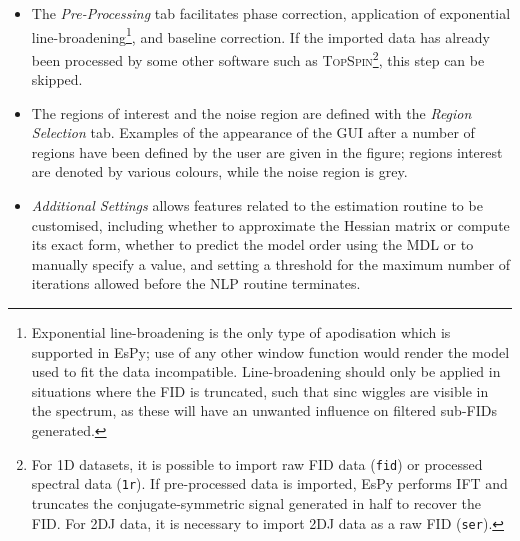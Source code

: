 \begin{itemize}
    \item The \emph{Pre-Processing} tab facilitates phase correction,
        application of exponential line-broadening\footnote{
            Exponential line-broadening is the only type of apodisation which
            is supported in \ac{EsPy}; use of any other window function
            would render the model used to fit the data incompatible.
            Line-broadening should only be applied in
            situations where the \ac{FID} is truncated, such that sinc wiggles
            are visible in the spectrum, as these will have an unwanted
            influence on filtered sub-\acp{FID} generated.
        }, and baseline correction. If the imported data has already been
        processed by some other software such as \textsc{TopSpin}\footnote{
            For \ac{1D} datasets, it is possible to import raw \ac{FID} data
            (\texttt{fid}) or processed spectral data (\texttt{1r}). If
            pre-processed data is imported, \ac{EsPy} performs \ac{IFT} and
            truncates the conjugate-symmetric signal generated in half to
            recover the \ac{FID}. For \ac{2DJ} data, it is necessary to import
            \ac{2DJ} data as a raw \ac{FID} (\texttt{ser}).
        }, this step can be skipped.
    \item The regions of interest and the noise region are
        defined with the \emph{Region Selection} tab. Examples of the
        appearance of the \ac{GUI} after a number of regions have been defined
        by the user are given in the figure; regions interest are denoted by
        various colours, while the noise region is grey.
    \item \emph{Additional Settings} allows features related to the estimation
        routine to be customised, including whether to approximate the Hessian
        matrix or compute its exact form, whether to predict the model order
        using the \ac{MDL} or to manually specify a value, and setting a
        threshold for the maximum number of iterations allowed before the
        \ac{NLP} routine terminates.
\end{itemize}

